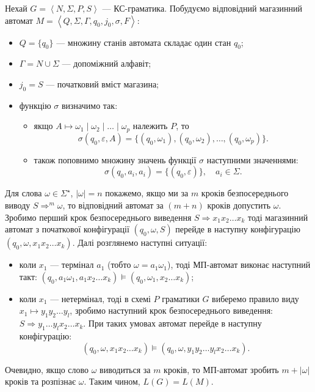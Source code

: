 Нехай $G = \left\langle N, \Sigma, P, S \right\rangle$ --- КС-граматика. Побудуємо відповідний магазинний автомат $M = \left\langle Q, \Sigma, \Gamma, q_0, j_0, \sigma, F \right\rangle$:
\begin{itemize}
	\item $Q = \{q_0\}$ --- множину станів автомата складає один стан $q_0$;
	\item $\Gamma = N \cup \Sigma$ --- допоміжний алфавіт;
	\item $j_0 = S$ --- початковий вміст магазина;
	\item функцію $\sigma$ визначимо так:
	\begin{itemize}
		\item якщо $A \mapsto \omega_1 \mid \omega_2 \mid \ldots \mid \omega_p$ належить $P$, то
		\[ \sigma(q_0, \varepsilon, A)=\{(q_0, \omega_1), (q_0, \omega_2), \ldots, (q_0, \omega_p)\}.\]
		\item також поповнимо множину значень функції $\sigma$ наступними значеннями:
		\[ \sigma(q_0, a_i, a_i) = \{(q_0, \varepsilon)\}, \quad a_i \in \Sigma.\]
	\end{itemize}
\end{itemize}

Для слова $\omega \in \Sigma^\star$, $|\omega| = n$ покажемо, якщо ми за $m$ кроків 
безпосереднього виводу $S \Rightarrow^m \omega$, то відповідний автомат за $(m + n)$ кроків допустить $\omega$. Зробимо перший крок безпосереднього виведення $S \Rightarrow x_1 x_2 \ldots x_k$ тоді магазинний автомат з початкової конфігурації $(q_0, \omega, S)$ перейде в наступну конфігурацію $(q_0, \omega, x_1 x_2 \ldots x_k)$. Далі розглянемо наступні ситуації:
\begin{itemize}
	\item коли $x_1$ --- термінал $a_1$ (тобто $\omega = a_1 \omega_1$), тоді МП-автомат виконає наступний такт: $(q_0, a_1 \omega_1, a_1 x_2 \ldots x_k) \models (q_0, \omega_1, x_2 \ldots x_k)$;
	\item коли $x_1$ --- нетермінал, тоді в схемі $P$ граматики $G$ виберемо правило виду $x_1 \mapsto y_1 y_2 \ldots y_l$, зробимо наступний крок безпосереднього виведення: $S \Rightarrow y_1 \ldots y_l x_2 \ldots x_k$. При таких умовах автомат перейде в наступну конфігурацію:
	\[ (q_0, \omega, x_1 x_2 \ldots x_k) \models (q_0, \omega, y_1 y_2 \ldots y_l x_2 \ldots x_k).\]
\end{itemize}

Очевидно, якщо слово $\omega$ виводиться за $m$ кроків, то МП-автомат зробить $m + |\omega|$ кроків та розпізнає $\omega$. Таким чином, $L(G) = L(M)$.

